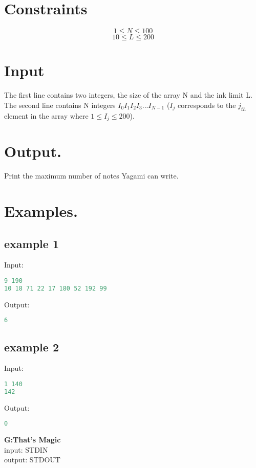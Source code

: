 \documentclass[10pt]{article}
\begin{document}
\section{Constraints}
$$ 1\le N \le 100 $$
$$ 10 \le L \le 200 $$
\section{Input}
The first line contains two integers, the size of the array N and the ink limit L.\\
The second line contains N integers $I_0 I_1 I_2 I_3 ... I_{N-1} $ ($I_j$ corresponds to the $j_{th}$ element in the array
where $ 1\le I_j \le 200 $).
\section{Output.}
Print the maximum number of notes Yagami can write.
\section{Examples.}
\subsection{example 1}
Input:
\begin{lstlisting}[language=Python]
9 190
10 18 71 22 17 180 52 192 99
\end{lstlisting}
Output:
\begin{lstlisting}[language=Python]
6
\end{lstlisting}

\subsection{example 2}
Input:
\begin{lstlisting}[language=Python]
1 140
142
\end{lstlisting}
Output:
\begin{lstlisting}[language=Python]
0
\end{lstlisting}
\newpage
\begin{center}
    \Huge { \textbf{G:That's Magic}}\\
\normalsize  { input:  STDIN}\\
\normalsize{    output: STDOUT}
\end{center}
\end{document}
